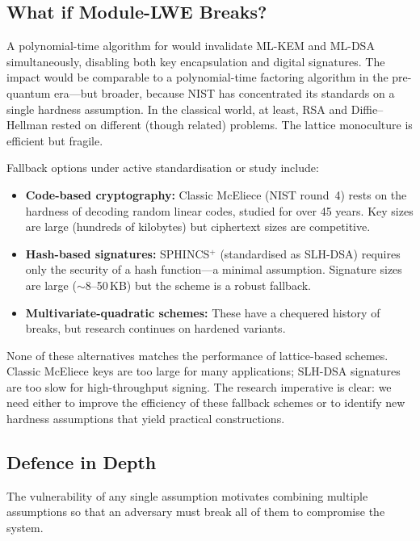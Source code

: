 \subsection{What if Module-LWE Breaks?}
\label{subsec:mlwe-break}

A polynomial-time algorithm for \mlwe{} would invalidate ML-KEM and ML-DSA simultaneously, disabling both key encapsulation and digital signatures.  The impact would be comparable to a polynomial-time factoring algorithm in the pre-quantum era---but broader, because NIST has concentrated its standards on a single hardness assumption.  In the classical world, at least, RSA and Diffie--Hellman rested on different (though related) problems.  The lattice monoculture is efficient but fragile.

Fallback options under active standardisation or study include:
\begin{itemize}
\item \textbf{Code-based cryptography:} Classic McEliece (NIST round~4) rests on the hardness of decoding random linear codes, studied for over 45 years.  Key sizes are large (hundreds of kilobytes) but ciphertext sizes are competitive.
\item \textbf{Hash-based signatures:} SPHINCS$^+$ (standardised as SLH-DSA) requires only the security of a hash function---a minimal assumption.  Signature sizes are large ($\sim$8--50\,KB) but the scheme is a robust fallback.
\item \textbf{Multivariate-quadratic schemes:} These have a chequered history of breaks, but research continues on hardened variants.
\end{itemize}

None of these alternatives matches the performance of lattice-based schemes.  Classic McEliece keys are too large for many applications; SLH-DSA signatures are too slow for high-throughput signing.  The research imperative is clear: we need either to improve the efficiency of these fallback schemes or to identify new hardness assumptions that yield practical constructions.

\subsection{Defence in Depth}
\label{subsec:defence-depth}

The vulnerability of any single assumption motivates combining multiple assumptions so that an adversary must break all of them to compromise the system.


